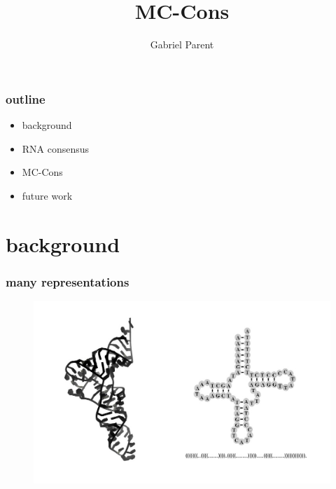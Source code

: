 \documentclass{beamer}
\title{MC-Cons}
\author{Gabriel Parent}
\begin{document}
\maketitle

\begin{frame}
	\frametitle{outline}
	\begin{center}
		\begin{itemize}
			\item background
			\item RNA consensus
			\item MC-Cons
			\item future work
		\end{itemize}
	\end{center}
\end{frame}


\section{background}

\begin{frame}
	\frametitle{many representations}
	\begin{figure}[!htb]
	\centering
	\includegraphics[scale=0.3]{figs/representations}
	\end{figure} 
\end{frame}
\end{document}
